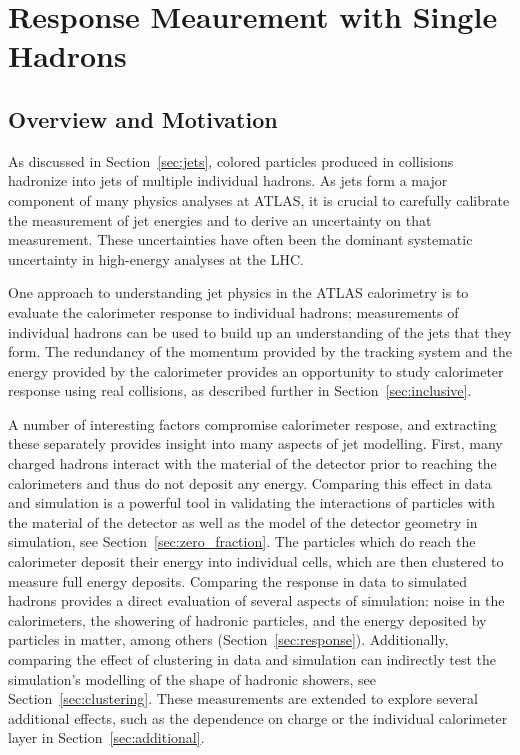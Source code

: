 \chapter{Response Meaurement with Single Hadrons}

\label{ch:singlehadrons}

\section{Overview and Motivation}

As discussed in Section~\ref{sec:jets}, colored particles produced in collisions hadronize into jets of multiple individual hadrons.
As jets form a major component of many physics analyses at ATLAS, it is crucial to carefully calibrate the measurement of jet energies and to derive an uncertainty on that measurement.
These uncertainties have often been the dominant systematic uncertainty in high-energy analyses at the LHC.

One approach to understanding jet physics in the ATLAS calorimetry is to evaluate the calorimeter response to individual hadrons; measurements of individual hadrons can be used to build up an understanding of the jets that they form.
The redundancy of the momentum provided by the tracking system and the energy provided by the calorimeter provides an opportunity to study calorimeter response using real collisions, as described further in Section~\ref{sec:inclusive}.

A number of interesting factors compromise calorimeter respose, and extracting these separately provides insight into many aspects of jet modelling.
First, many charged hadrons interact with the material of the detector prior to reaching the calorimeters and thus do not deposit any energy.
Comparing this effect in data and simulation is a powerful tool in validating the interactions of particles with the material of the detector as well as the model of the detector geometry in simulation, see Section~\ref{sec:zero_fraction}.
The particles which do reach the calorimeter deposit their energy into individual cells, which are then clustered to measure full energy deposits.
Comparing the response in data to simulated hadrons provides a direct evaluation of several aspects of simulation: noise in the calorimeters, the showering of hadronic particles, and the energy deposited by particles in matter, among others (Section~\ref{sec:response}). 
Additionally, comparing the effect of clustering in data and simulation can indirectly test the simulation's modelling of the shape of hadronic showers, see Section~\ref{sec:clustering}.
These measurements are extended to explore several additional effects, such as the dependence on charge or the individual calorimeter layer in Section~\ref{sec:additional}. 

